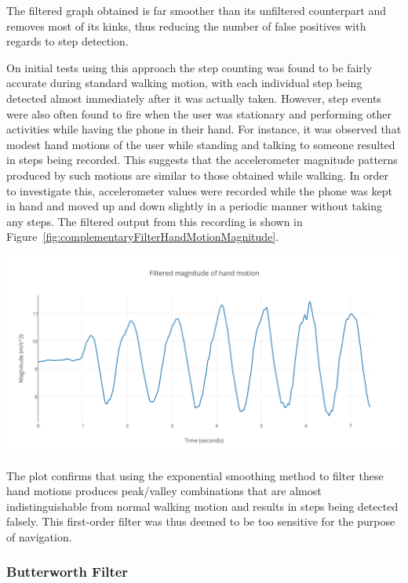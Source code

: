 \documentclass[12pt,a4paper]{report}
\begin{document}
The filtered graph obtained is far smoother than its unfiltered counterpart and removes most of its kinks, thus reducing the number of false positives with regards to step detection.   

On initial tests using this approach the step counting was found to be fairly accurate during standard walking motion, with each individual step being detected almost immediately after it was actually taken. However, step events were also often found to fire when the user was stationary and performing other activities while having the phone in their hand. For instance, it was observed that modest hand motions of the user while standing and talking to someone resulted in steps being recorded. This suggests that the accelerometer magnitude patterns produced by such motions are similar to those obtained while walking. In order to investigate this, accelerometer values were recorded while the phone was kept in hand and moved up and down slightly in a periodic manner without taking any steps. The filtered output from this recording is shown in Figure~\ref{fig:complementaryFilterHandMotionMagnitude}. 

\begin{center}
\includegraphics[scale=0.9]{images/complementaryFilterHandMotionMagnitude.png}
\label{fig:complementaryFilterHandMotionMagnitude}
\end{center}
The plot confirms that using the exponential smoothing method to filter these hand motions produces peak/valley combinations that are almost indistinguishable from normal walking motion and results in steps being detected falsely. This first-order filter was thus deemed to be too sensitive for the purpose of navigation. 

\subsubsection{Butterworth Filter}
\end{document}
